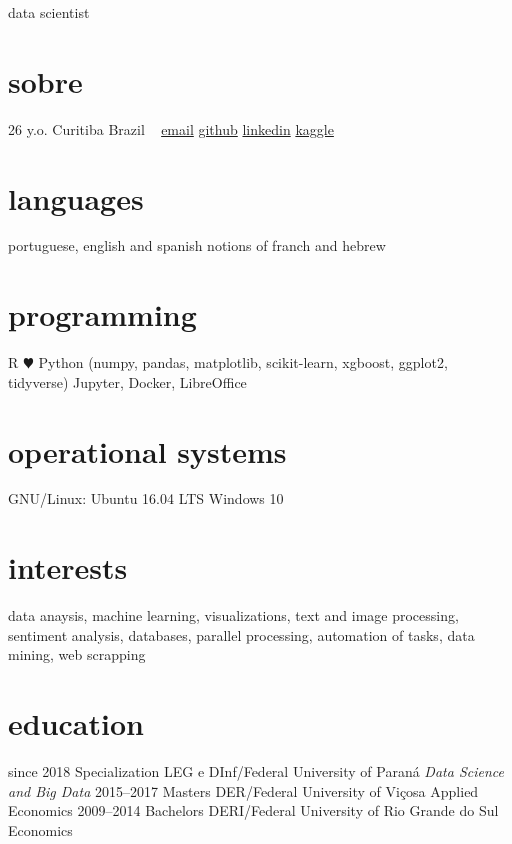 \documentclass[]{friggeri-cv}
\begin{document}
       {data scientist}


\begin{aside}
  \section{sobre}
    26 y.o. 
    Curitiba
    Brazil
    ~
    \href{mailto:jt\_anchante@hotmail.com}{email}
    \href{https://github.com/jayme-anchante/}{github}
    \href{https://www.linkedin.com/in/jayme-anchante}{linkedin}
    \href{https://www.kaggle.com/jtanchante}{kaggle}
  \section{languages}
    portuguese, english and spanish
    notions of franch and hebrew
  \section{programming}
    R {\color{red} $\varheartsuit$} Python
    (numpy, pandas, matplotlib,
    scikit-learn, xgboost,
    ggplot2, tidyverse)
    Jupyter, Docker, LibreOffice
  \section{operational systems}
    GNU/Linux: Ubuntu 16.04 LTS
    Windows 10
\end{aside}

\section{interests}

data anaysis, machine learning, visualizations, text and image
processing, sentiment analysis, databases, parallel processing,
automation of tasks, data mining, web scrapping

\section{education}

\begin{entrylist}
  \entry
    {since 2018}
    {Specialization}
    {LEG e DInf/Federal University of Paraná}
    {\emph{Data Science and Big Data}}
  \entry
    {2015–2017}
    {Masters}
    {DER/Federal University of Viçosa}
    {Applied Economics}
  \entry
    {2009–2014}
    {Bachelors}
    {DERI/Federal University of Rio Grande do Sul}
    {Economics}
\end{entrylist}
\end{document}
